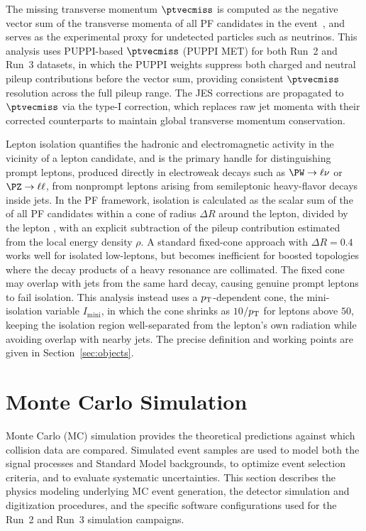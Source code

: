 The missing transverse momentum $\ptvecmiss$ is computed as the negative vector sum of the transverse momenta of all PF candidates in the event~\cite{CMS:2019ctu}, and serves as the experimental proxy for undetected particles such as neutrinos. This analysis uses PUPPI-based $\ptvecmiss$ (PUPPI MET) for both Run~2 and Run~3 datasets, in which the PUPPI weights suppress both charged and neutral pileup contributions before the vector sum, providing consistent $\ptvecmiss$ resolution across the full pileup range. The JES corrections are propagated to $\ptvecmiss$ via the type-I correction, which replaces raw jet momenta with their corrected counterparts to maintain global transverse momentum conservation.

Lepton isolation quantifies the hadronic and electromagnetic activity in the vicinity of a lepton candidate, and is the primary handle for distinguishing prompt leptons, produced directly in electroweak decays such as $\PW \to \ell\nu$ or $\PZ \to \ell\ell$, from nonprompt leptons arising from semileptonic heavy-flavor decays inside jets. In the PF framework, isolation is calculated as the scalar sum of the \pT of all PF candidates within a cone of radius $\Delta R$ around the lepton, divided by the lepton \pT, with an explicit subtraction of the pileup contribution estimated from the local energy density $\rho$. A standard fixed-cone approach with $\Delta R = 0.4$ works well for isolated low-\pT leptons, but becomes inefficient for boosted topologies where the decay products of a heavy resonance are collimated. The fixed cone may overlap with jets from the same hard decay, causing genuine prompt leptons to fail isolation. This analysis instead uses a $p_{\mathrm{T}}$-dependent cone, the mini-isolation variable $I_{\text{mini}}$, in which the cone shrinks as $10$\GeV$/p_{\mathrm{T}}$ for leptons above $50$\GeV, keeping the isolation region well-separated from the lepton's own radiation while avoiding overlap with nearby jets. The precise definition and working points are given in Section~\ref{sec:objects}.

\section{Monte Carlo Simulation}
\label{sec:mc_sim}

Monte Carlo (MC) simulation provides the theoretical predictions against which collision data are compared. Simulated event samples are used to model both the signal processes and Standard Model backgrounds, to optimize event selection criteria, and to evaluate systematic uncertainties. This section describes the physics modeling underlying MC event generation, the detector simulation and digitization procedures, and the specific software configurations used for the Run~2 and Run~3 simulation campaigns.

